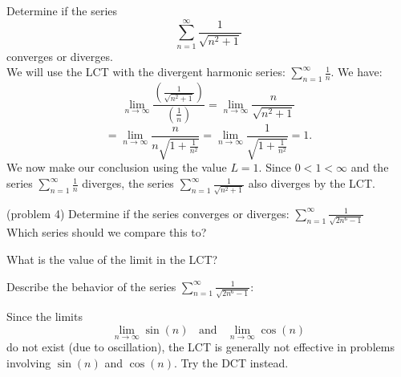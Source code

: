 \documentclass[handout]{ximera}
\begin{document}
\begin{example}[example 4]
Determine if the series 
\[
\sum_{n=1}^\infty \frac{1}{\sqrt{n^2 + 1}}
\]
converges or diverges.\\
We will use the LCT with the divergent harmonic series: $\displaystyle{\sum_{n=1}^\infty \frac{1}{n}}$. We have:
\[
\lim_{n \to \infty} \frac{\left(\frac{1}{\sqrt{n^2 + 1}}\right)}{\left(\frac{1}{n}\right)} = \lim_{n \to \infty} \frac{n}{\sqrt{n^2 + 1}}
\]
\[
= \lim_{n \to \infty} \frac{n}{n\sqrt{1 + \frac{1}{n^2}}} = \lim_{n \to \infty} \frac{1}{\sqrt{1 + \frac{1}{n^2}}} = 1.
\]
We now make our conclusion using the value $L = 1$. Since $0 < 1 < \infty$ and the series $\displaystyle{\sum_{n=1}^\infty \frac{1}{n}}$
diverges, the series $\displaystyle{\sum_{n=1}^\infty \frac{1}{\sqrt{n^2 + 1}}}$ also diverges by the LCT.
\end{example}




\begin{problem}(problem 4)
Determine if the series converges or diverges: $\displaystyle{\sum_{n=1}^\infty \frac{1}{\sqrt{2n^6 - 1}}}$\\
Which series should we compare this to?

\begin{multipleChoice}
\end{multipleChoice}

What is the value of the limit in the LCT?
\begin{multipleChoice}
\end{multipleChoice}

Describe the behavior of the series $\sum_{n=1}^\infty \frac{1}{\sqrt{2n^6 - 1}}:$
\begin{multipleChoice}
\end{multipleChoice}

\end{problem}


\begin{remark}
Since the limits
\[
\lim_{n \to \infty} \sin(n) \;\; \text{ and } \;\; \lim_{n \to \infty} \cos(n)
\]
do not exist (due to oscillation), the LCT is generally not effective in problems involving $\sin(n)$ and $\cos(n)$. Try the DCT instead.
\end{remark}
\end{document}
